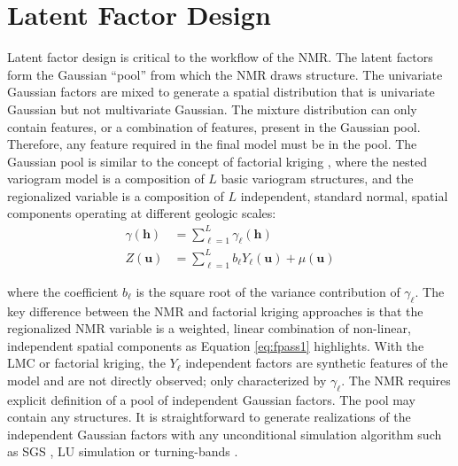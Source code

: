 
\FloatBarrier
\section{Latent Factor Design}
\label{sec:04factord}

Latent factor design is critical to the workflow of the \gls{NMR}. The latent factors form the Gaussian ``pool'' from which the \gls{NMR} draws structure. The univariate Gaussian factors are mixed to generate a spatial distribution that is univariate Gaussian but not multivariate Gaussian. The mixture distribution can only contain features, or a combination of features, present in the Gaussian pool. Therefore, any feature required in the final model must be in the pool. The Gaussian pool is similar to the concept of factorial kriging \citep{goovaerts1997geostatistics}, where the nested variogram model is a composition of $L$ basic variogram structures, and the regionalized variable is a composition of $L$ independent, standard normal, spatial components operating at different geologic scales:
\begin{align}
    \label{eq:gamma_comp}
    \gamma(\mathbf{h}) & = \sum_{\ell=1}^{L} \gamma_{\ell}(\mathbf{h})                     \\
    \label{eq:z_comp}
    Z(\mathbf{u})      & = \sum_{\ell=1}^{L}b_{\ell}Y_{\ell}(\mathbf{u}) + \mu(\mathbf{u})
\end{align}

\lowercase{Where} the coefficient $b_{\ell}$ is the square root of the variance contribution of $\gamma_{\ell}$. The key difference between the \gls{NMR} and factorial kriging approaches is that the regionalized \gls{NMR} variable is a weighted, linear combination of non-linear, independent spatial components as Equation \ref{eq:fpass1} highlights. With the \gls{LMC} or factorial kriging, the $Y_{\ell}$ independent factors are synthetic features of the model and are not directly observed; only characterized by $\gamma_{\ell}$. The \gls{NMR} requires explicit definition of a pool of independent Gaussian factors. The pool may contain any structures. It is straightforward to generate realizations of the independent Gaussian factors with any unconditional simulation algorithm such as \gls{SGS} \citep{gomez-hernandez1993joint}, LU simulation \citep{davis1987production} or turning-bands \citep{journel1974geostatistics}.

